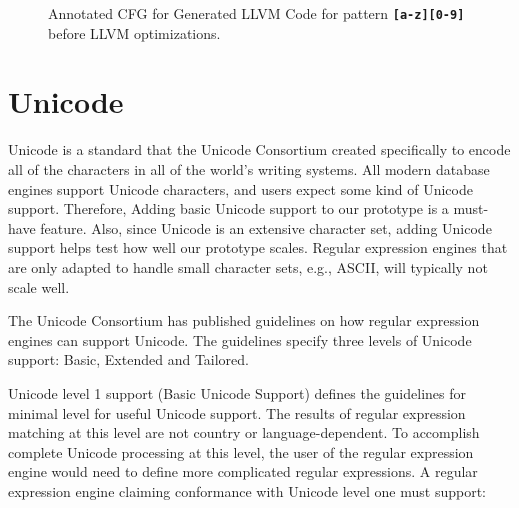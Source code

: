 \begin{figure}[H]
    \caption{Annotated CFG for Generated LLVM Code for pattern \texttt{\textbf{[a-z][0-9]}} before LLVM optimizations.}
    \label{fig:annocfg}
\end{figure}

\section{Unicode}
Unicode is a standard that the Unicode Consortium created specifically to encode all of the characters in all of the world's writing systems. All modern database engines support Unicode characters, and users expect some kind of Unicode support. Therefore, Adding basic Unicode support to our prototype is a must-have feature. Also, since Unicode is an extensive character set, adding Unicode support helps test how well our prototype scales. Regular expression engines that are only adapted to handle small character sets, e.g., ASCII, will typically not scale well.

The Unicode Consortium has published guidelines \cite{unicodeguideline} on how regular expression engines can support Unicode. The guidelines specify three levels of Unicode support: Basic, Extended and Tailored.

Unicode level 1 support (Basic Unicode Support) defines the guidelines for minimal level for useful Unicode support. The results of regular expression matching at this level are not country or language-dependent. To accomplish complete Unicode processing at this level, the user of the regular expression engine would need to define more complicated regular expressions. A regular expression engine claiming conformance with Unicode level one must support:

